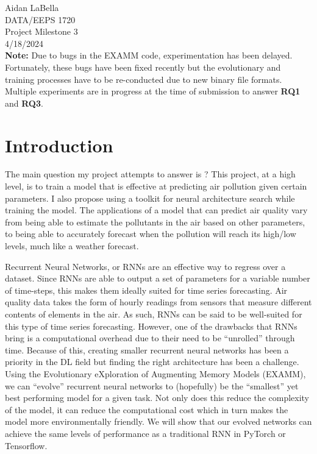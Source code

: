 \documentclass[12pt]{article}
\begin{document}
\noindent
Aidan LaBella \\
DATA/EEPS 1720 \\
Project Milestone 3\\
4/18/2024 \\

\textbf{Note:} Due to bugs in the EXAMM code, experimentation has been delayed. Fortunately, these bugs have been fixed recently but the evolutionary and training processes have to be re-conducted due to new binary file formats. Multiple experiments are in progress at the time of submission to answer \textbf{RQ1} and \textbf{RQ3}.\\
\section{Introduction}
The main question my project attempts to answer is ? This project, at a high level, is to train a model that is effective at predicting air pollution given certain parameters. I also propose using a toolkit for neural architecture search while training the model. The applications of a model that can predict air quality vary from being able to estimate the pollutants in the air based on other parameters, to being able to accurately forecast when the pollution will reach its high/low levels, much like a weather forecast. 

Recurrent Neural Networks, or RNNs are an effective way to regress over a dataset. Since RNNs are able to output a set of parameters for a variable number of time-steps, this makes them ideally suited for time series forecasting. Air quality data takes the form of hourly readings from sensors that measure different contents of elements in the air. As such, RNNs can be said to be well-suited for this type of time series forecasting. However, one of the drawbacks that RNNs bring is a computational overhead due to their need to be “unrolled” through time. Because of this, creating smaller recurrent neural networks has been a priority in the DL field but finding the right architecture has been a challenge. Using the Evolutionary eXploration of Augmenting Memory Models (EXAMM)\cite{ororbia_investigating_2019}, we can “evolve'' recurrent neural networks to (hopefully) be the “smallest” yet best performing model for a given task. Not only does this reduce the complexity of the model, it can reduce the computational cost which in turn makes the model more environmentally friendly. We will show that our evolved networks can achieve the same levels of performance as a traditional RNN in PyTorch or Tensorflow.
\end{document}
